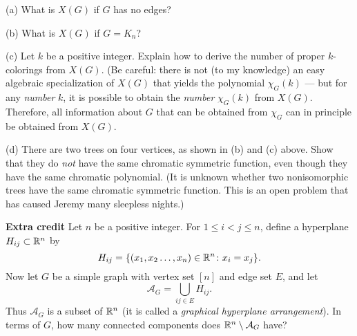 (a) What is $X(G)$ if $G$ has no edges? 

(b) What is $X(G)$ if $G=K_n$?

(c) Let $k$ be a positive integer.  Explain how to derive the number of proper $k$-colorings from $X(G)$.  (Be careful: there is not (to my knowledge) an easy algebraic specialization of $X(G)$ that yields the polynomial $\chi_G(k)$ --- but for any \emph{number} $k$, it is possible to obtain the \emph{number} $\chi_G(k)$ from $X(G)$.  Therefore, all information about $G$ that can be obtained from $\chi_G$ can in principle be obtained from $X(G)$.

(d) There are two trees on four vertices, as shown in (b) and (c) above.  Show that they do \emph{not} have the same chromatic symmetric function, even though they have the same chromatic polynomial.  (It is unknown whether two nonisomorphic trees have the same chromatic symmetric function.  This is an open problem that has caused Jeremy many sleepless nights.)

\vfill

{\bf Extra credit}  Let $n$ be a positive integer.  For $1\leq i<j\leq n$, define a hyperplane $H_{ij}\subset\mathbb{R}^n$ by
\[H_{ij} = \{(x_1,x_2\dots,x_n)\in\mathbb{R}^n \colon x_i=x_j\}.\]
Now let $G$ be a simple graph with vertex set $[n]$ and edge set $E$, and let
\[\mathcal{A}_G = \bigcup_{ij\in E} H_{ij}.\]
Thus $\mathcal{A}_G$ is a subset of $\mathbb{R}^n$ (it is called a \emph{graphical hyperplane arrangement}).  In terms of $G$,
how many connected components does $\mathbb{R}^n\setminus\mathcal{A}_G$ have?


